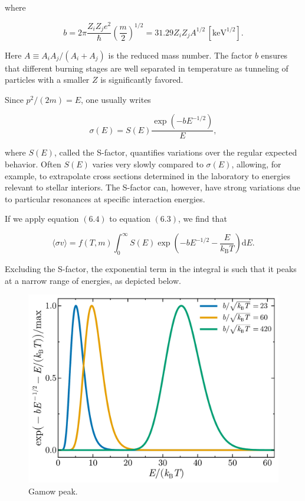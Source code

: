 \documentclass[twocolumn]{article}
\begin{document}
where

\[b=2\pi \frac{Z_i Z_j e^2}{\hbar}\left(\frac{m}{2}\right)^{1/2}=31.29 Z_iZ_j A^{1/2}\,[\mathrm{keV}^{1/2}].\]

Here \(A\equiv A_iA_j/(A_i+A_j)\) is the reduced mass number. The factor
\(b\) ensures that different burning stages are well separated in
temperature as tunneling of particles with a smaller \(Z\) is
significantly favored.

Since \(p^2/(2m)=E\), one usually writes

\[\sigma(E)=S(E)\frac{\exp\left(-bE^{-1/2}\right)}{E},\tag{6.4}\]

where \(S(E)\), called the S-factor, quantifies variations over the
regular expected behavior. Often \(S(E)\) varies very slowly compared to
\(\sigma(E)\), allowing, for example, to extrapolate cross sections
determined in the laboratory to energies relevant to stellar interiors.
The S-factor can, however, have strong variations due to particular
resonances at specific interaction energies.

If we apply equation \((6.4)\) to equation \((6.3)\), we find that

\[\langle\sigma v\rangle = f(T,m)\int_0^\infty S(E)\exp\left(-bE^{-1/2}-\frac{E}{k_\mathrm{B}T}\right)\mathrm{d}E.\tag{6.5}\]

Excluding the S-factor, the exponential term in the integral is such
that it peaks at a narrow range of energies, as depicted below.

\begin{figure}
\centering
\includegraphics{../assets/7_nucleo1/gamow.pdf}
\caption{Gamow peak.}
\end{figure}
\end{document}

